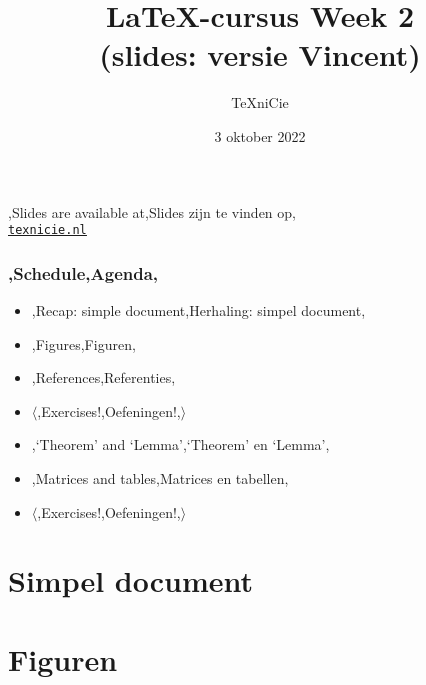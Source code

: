 \documentclass[
    dutch,
    everyoneauthor=true,
    darktheme,
    defaultSlideCollection=vincent,
    slidenames=true
]{../../cursuspresentatie}
\title[\LaTeX{}-cursus Week 2]{\LaTeX{}-cursus Week 2\\(slides: versie Vincent)}
\author{\TeX niCie}
\date{3 oktober 2022}
\begin{document}

\begin{frame}
    \titlepage
    \centering

    {\Large\lang,Slides are available at,Slides zijn te vinden op,\\
    \href{https://texnicie.nl}{\ul{\texttt{texnicie.nl}}}}
\end{frame}

\setul{1pt}{2pt}

\begin{frame}
    \frametitle{\lang,Schedule,Agenda,}
    
    \begin{itemize}
        \item \lang,Recap: simple document,Herhaling: simpel document,
        \item \lang,Figures,Figuren,
        \item \lang,References,Referenties,
        \item $ \langle $\lang,Exercises!,Oefeningen!,$ \rangle $
        \item \lang,`Theorem' and `Lemma',`Theorem' en `Lemma',
        \item \lang,Matrices and tables,Matrices en tabellen,
        \item $ \langle $\lang,Exercises!,Oefeningen!,$ \rangle $
    \end{itemize}
\end{frame}

\section{Simpel document}


\section{Figuren}
\end{document}
